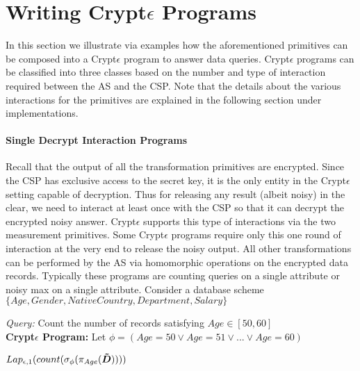 \section{Writing Crypt$\epsilon$ Programs}\label{program}
In this section we illustrate via examples how the aforementioned primitives can be composed into a Crypt$\epsilon$ program to answer data queries.
Crypt$\epsilon$ programs can be classified into three classes based on the number and type of interaction required between the \textsf{AS} and the \textsf{CSP}.  Note that the details about the various interactions for the primitives are explained in the following section under implementations. 
\paragraph{\textbf{Single Decrypt Interaction Programs}}
Recall that the output of all the transformation primitives are encrypted.  Since  the \textsf{CSP} has exclusive access to the secret key, it is the only entity in the Crypt$\epsilon$ setting capable of decryption. Thus for releasing any result (albeit noisy) in the clear, we need to interact at least once with the \textsf{CSP} so that it can decrypt the encrypted noisy answer. Crypt$\epsilon$ supports this type of interactions via the two measurement primitives. Some Crypt$\epsilon$ programs require only this one round of interaction at the very end to release the noisy output. All other transformations can be performed by the \textsf{AS} via homomorphic operations on the encrypted data records. Typically these programs are counting queries on a single attribute or noisy max on a single attribute. 
Consider a database scheme $\{Age, Gender, NativeCountry, Department, Salary\}$ %
\begin{exmp}
\textit{Query: } Count the number of records satisfying $Age \in [50,60]$\\
\textbf{Crypt$\epsilon$ Program:}
Let $\phi=(Age=50 \vee Age=51 \vee ... \vee Age=60)$ \end{exmp} $Lap_{\epsilon,1}(count(\sigma_{\phi}(\pi_{Age}(\boldsymbol{\tilde{D}}))))$
